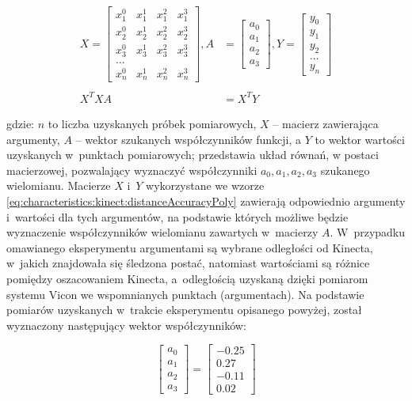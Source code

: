 \begin{equation}
	\begin{split}
		X = 	\begin{bmatrix}
		x_1^0&x_1^1&x_1^2&x_1^3\\
		x_2^0&x_2^1&x_2^2&x_2^3\\
		x_3^0&x_3^1&x_3^2&x_3^3\\
		\dots\\
		x_n^0&x_n^1&x_n^2&x_n^3
		\end{bmatrix} ,
		A &= 	\begin{bmatrix}
		a_0\\a_1\\a_2\\a_3
		\end{bmatrix} ,
		Y = 
		\begin{bmatrix}
			y_0 \\y_1\\y_2\\\dots\\y_n
		\end{bmatrix} \\
		& \\
		X^TXA &= X^TY
	\end{split}
	\label{eq:characteristics:kinect:distanceAccuracyPoly}
\end{equation}

gdzie: $n$ to liczba uzyskanych próbek pomiarowych, $X$ -- macierz zawierająca argumenty,	$A$ -- wektor szukanych współczynników funkcji, a $Y$ to wektor wartości uzyskanych w~punktach pomiarowych; przedstawia układ równań, w postaci macierzowej, pozwalający wyznaczyć współczynniki $a_0 ,a_1, a_2, a_3$ szukanego wielomianu. Macierze $X$ i~$Y$ wykorzystane we wzorze \ref{eq:characteristics:kinect:distanceAccuracyPoly} zawierają odpowiednio argumenty i~wartości dla tych argumentów, na podstawie których możliwe będzie wyznaczenie współczynników wielomianu zawartych w~macierzy $A$. W~przypadku omawianego eksperymentu argumentami są wybrane odległości od Kinecta, w~jakich znajdowała się śledzona postać, natomiast wartościami są różnice pomiędzy oszacowaniem Kinecta, a~odległością uzyskaną dzięki pomiarom systemu Vicon we wspomnianych punktach (argumentach). Na podstawie pomiarów uzyskanych w~trakcie eksperymentu opisanego powyżej,  został wyznaczony następujący wektor współczynników:

\begin{equation}
	\label{eq:characteristics:kinect:distanceAccuracyCoef}
	\begin{bmatrix}
		a_0 \\a_1\\a_2\\a_3
	\end{bmatrix} = 
	\begin{bmatrix}
		- 0.25 \\  0.27 \\- 0.11\\0.02		
	\end{bmatrix}	
\end{equation}
		
